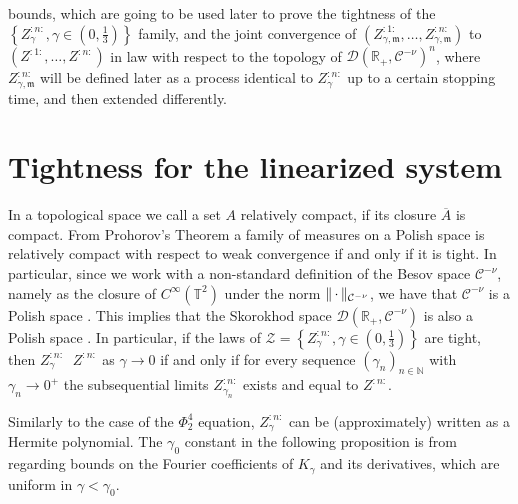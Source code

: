 \documentclass{report}
\newcommand{\NN}{\mathbb{N}}
\newcommand{\RR}{\mathbb{R}}
\newcommand{\TT}{\mathbb{T}}
\DeclarePairedDelimiter\norm{\lVert}{\rVert}%
\newcommand{\Placeholder}{\,\mathrel{\cdot}\,}
\newcommand{\Closure}[1]{\overline{#1}}
\DeclareMathOperator{\DConv}{\stackrel{(d)}{\longrightarrow}}
\theoremstyle{remark}
\theoremstyle{definition}
\begin{document}
bounds, which are going to be used later to prove the tightness of the $\left\{Z^{:n:}_\gamma, \gamma \in (0, \frac{1}{3})\right\}$ family, and the joint convergence of $(Z^{:1:}_{\gamma, \mathfrak{m}}, \ldots, Z^{:n:}_{\gamma, \mathfrak{m}})$ to $(Z^{:1:}, \ldots, Z^{:n:})$ in law with respect to the topology of $\mathcal{D}(\RR_+, \mathcal{C}^{-\nu})^n$, where $Z^{:n:}_{\gamma, \mathfrak{m}}$ will be defined later as a process identical to $Z^{:n:}_{\gamma}$ up to a certain stopping time, and then extended differently.

\chapter{Tightness for the linearized system}
In a topological space we call a set $A$ relatively compact, if its closure $\Closure{A}$ is compact. From Prohorov's Theorem \cite[Theorem 5.1. and Theorem 5.2.]{billingsley2013convergence} a family of measures on a Polish space is relatively compact with respect to weak convergence if and only if it is tight. In particular, since we work with a non-standard definition of the Besov space $\mathcal{C}^{-\nu}$, namely as the closure of $C^\infty\left(\TT^2\right)$ under the norm $\norm{\Placeholder}_{\mathcal{C}^{-\nu}}$, we have that $\mathcal{C}^{-\nu}$ is a Polish space \cite[p70]{mourrat2015convergencetwodimensionaldynamicisingkac}. This implies that the Skorokhod space $\mathcal{D}(\RR_+, \mathcal{C}^{-\nu})$ is also a Polish space \cite[Theorem 12.2.]{billingsley2013convergence}. In particular, if the laws of $\mathcal{Z} = \left\{Z^{:n:}_\gamma, \gamma \in (0, \frac{1}{3})\right\}$ are tight, then $Z^{:n:}_\gamma \DConv Z^{:n:}$ as $\gamma \to 0$ if and only if for every sequence $(\gamma_n)_{n \in \NN}$ with $\gamma_n \to 0^+$ the subsequential limits $Z^{:n:}_{\gamma_n}$ exists and equal to $Z^{:n:}$.

Similarly to the case of the $\Phi^4_2$ equation, $Z^{:n:}_\gamma$ can be (approximately) written as a Hermite polynomial. The $\gamma_0$ constant in the following proposition is from \cite[Lemma 8.2]{mourrat2015convergencetwodimensionaldynamicisingkac} regarding bounds on the Fourier coefficients of $K_\gamma$ and its derivatives, which are uniform in $\gamma < \gamma_0$.
\end{document}

